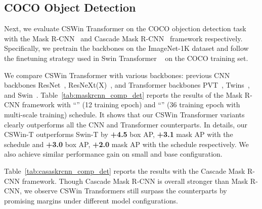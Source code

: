 \documentclass[10pt,twocolumn,letterpaper]{article}
\begin{document}
\subsection{COCO Object Detection}
Next, we evaluate CSWin Transformer on the COCO objection detection task with the Mask R-CNN~\cite{he2017mask} and Cascade Mask R-CNN~\cite{cai2018cascade} framework respectively. Specifically, we pretrain the backbones on the ImageNet-1K dataset and follow the finetuning strategy used in Swin Transformer ~\cite{liu2021swin} on the COCO training set. 


We compare CSWin Transformer with various backbones: previous CNN backbones ResNet~\cite{he2016deep}, ResNeXt(X)~\cite{xie2017aggregated},  and Transformer backbones  PVT~\cite{wang2021pyramid}, Twins~\cite{chu2021twins}, and Swin~\cite{liu2021swin}. Table~\ref{tab:maskrcnn_comp_det} reports the results of the Mask R-CNN framework with ``'' (12 training epoch) and ``'' (36 training epoch with multi-scale training) schedule. It shows that our CSWin Transformer variants clearly outperforms all the CNN and Transformer counterparts. In details, our CSWin-T outperforms Swin-T by \textbf{+4.5} box AP, \textbf{+3.1} mask AP with the  schedule and \textbf{+3.0} box AP, \textbf{+2.0} mask AP with the  schedule respectively. We also achieve similar performance gain on small and base configuration.



Table~\ref{tab:casaskrcnn_comp_det} reports the results with the Cascade Mask R-CNN framework. Though Cascade Mask R-CNN is overall stronger than Mask R-CNN, we observe CSWin Transformers still surpass the counterparts by promising margins under different model configurations.
\end{document}

